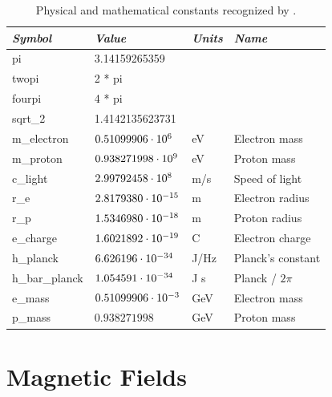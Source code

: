 \begin{table}
\centering
\begin{tabular}{|l|l|l|l|} \hline
  {\em Symbol}  & {\em Value}       & {\em Units} &  {\em Name}       \\ \hline
  pi            & 3.14159265359          &        &                   \\
  twopi         & 2 * pi                 &        &                   \\
  fourpi        & 4 * pi                 &        &                   \\
  sqrt_2        & 1.4142135623731        &        &                   \\
  m_electron    & $0.51099906 \cdot 10^{6}$   & eV     & Electron mass     \\
  m_proton      & $0.938271998 \cdot 10^{9}$  & eV     & Proton mass       \\
  c_light       & $2.99792458 \cdot 10^{8}$   & m/s    & Speed of light    \\
  r_e           & $2.8179380 \cdot 10^{-15}$  & m      & Electron radius   \\
  r_p           & $1.5346980 \cdot 10^{-18}$  & m      & Proton radius     \\
  e_charge      & $1.6021892 \cdot 10^{-19}$  & C      & Electron charge   \\
  h_planck      & $6.626196 \cdot 10^{-34}$   & J/Hz   & Planck's constant \\
  h_bar_planck  & $1.054591 \cdot 10^{-34}$   & J s    & Planck / $2\pi$   \\
  e_mass        & $0.51099906 \cdot 10^{-3}$  & GeV    & Electron mass     \\
  p_mass        & $0.938271998$          & GeV    & Proton mass       \\ \hline
\end{tabular}
\caption{Physical and mathematical constants recognized by \bmad.}
\label{t:constants}
\end{table}


\section{Magnetic Fields}
\label{s:fields}

